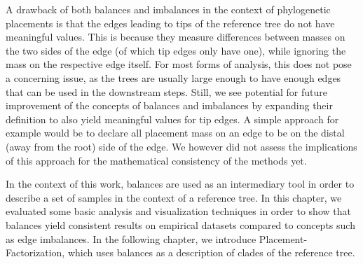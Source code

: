 A drawback of both balances and imbalances in the context of phylogenetic placements
is that the edges leading to tips of the reference tree do not have meaningful values.
This is because they measure differences between masses on the two sides of the edge
(of which tip edges only have one), while ignoring the mass on the respective edge itself.
For most forms of analysis, this does not pose a concerning issue, as the trees are usually large enough
to have enough edges that can be used in the downstream steps.
Still, we see potential for future improvement of the concepts of balances and imbalances
by expanding their definition to also yield meaningful values for tip edges.
A simple approach for example would be to declare all placement mass on an edge
to be on the distal (away from the root) side of the edge.
We however did not assess the implications of this approach for the mathematical consistency of the methods yet.

In the context of this work, balances are used as an intermediary tool
in order to describe a set of samples in the context of a reference tree.
In this chapter, we evaluated some basic analysis and visualization techniques in order to show
that balances yield consistent results on empirical datasets compared to concepts such as edge imbalances.
In the following chapter, we introduce Placement-Factorization,
which uses balances as a description of clades of the reference tree.
